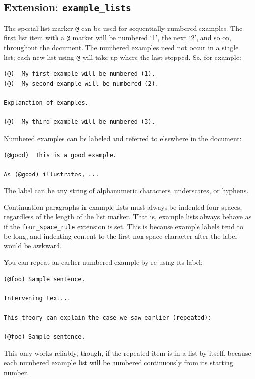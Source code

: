 \documentclass[
  b5paper
]{book}
\begin{document}
\subsection{\texorpdfstring{Extension:
\texttt{example\_lists}}{Extension: example\_lists}}\label{extension-example_lists}

The special list marker \texttt{@} can be used for sequentially numbered
examples. The first list item with a \texttt{@} marker will be numbered
`1', the next `2', and so on, throughout the document. The numbered
examples need not occur in a single list; each new list using \texttt{@}
will take up where the last stopped. So, for example:

\begin{verbatim}
(@)  My first example will be numbered (1).
(@)  My second example will be numbered (2).

Explanation of examples.

(@)  My third example will be numbered (3).
\end{verbatim}

Numbered examples can be labeled and referred to elsewhere in the
document:

\begin{verbatim}
(@good)  This is a good example.

As (@good) illustrates, ...
\end{verbatim}

The label can be any string of alphanumeric characters, underscores, or
hyphens.

Continuation paragraphs in example lists must always be indented four
spaces, regardless of the length of the list marker. That is, example
lists always behave as if the \texttt{four\_space\_rule} extension is
set. This is because example labels tend to be long, and indenting
content to the first non-space character after the label would be
awkward.

You can repeat an earlier numbered example by re-using its label:

\begin{verbatim}
(@foo) Sample sentence.

Intervening text...

This theory can explain the case we saw earlier (repeated):

(@foo) Sample sentence.
\end{verbatim}

This only works reliably, though, if the repeated item is in a list by
itself, because each numbered example list will be numbered continuously
from its starting number.
\end{document}
